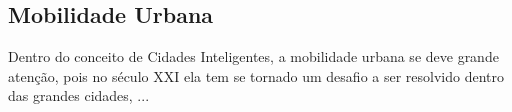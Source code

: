 \subsection{Mobilidade Urbana}
\label{subsec:mobilidadeurbana}
Dentro do conceito de Cidades Inteligentes, a mobilidade urbana se deve grande atenção, pois no século XXI ela tem se tornado um desafio a ser resolvido dentro das grandes cidades, ...

